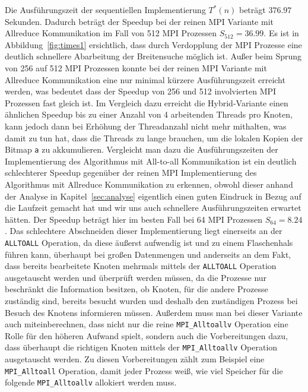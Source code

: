 \documentclass[11pt,a4paper]{article}
\begin{document}
Die Ausführungszeit der sequentiellen Implementierung \(T^{*}(n)\) beträgt \(376.97\) Sekunden. Dadurch beträgt der Speedup bei der reinen MPI Variante mit Allreduce Kommunikation im Fall von 512 MPI Prozessen \(S_{512} = 36.99\). Es ist in Abbildung~\ref{fig:times1} ersichtlich, dass durch Verdopplung der MPI Prozesse eine deutlich schnellere Abarbeitung der Breitensuche möglich ist. Außer beim Sprung von 256 auf 512 MPI Prozessen konnte bei der reinen MPI Variante mit Allreduce Kommunikation eine nur minimal kürzere Ausführungszeit erreicht werden, was bedeutet dass der Speedup von 256 und 512 involvierten MPI Prozessen fast gleich ist. Im Vergleich dazu erreicht die Hybrid-Variante einen ähnlichen Speedup bis zu einer Anzahl von 4 arbeitenden Threads pro Knoten, kann jedoch dann bei Erhöhung der Threadanzahl nicht mehr mithalten, was damit zu tun hat, dass die Threads zu lange brauchen, um die lokalen Kopien der Bitmap \lstinline{a} zu akkumulieren. Vergleicht man dazu die Ausführungszeiten der Implementierung des Algorithmus mit All-to-all Kommunikation ist ein deutlich schlechterer Speedup gegenüber der reinen MPI Implementierung des Algorithmus mit Allreduce Kommunikation zu erkennen, obwohl dieser anhand der Analyse in Kapitel~\ref{sec:analyse} eigentlich einen guten Eindruck in Bezug auf die Laufzeit gemacht hat und wir uns auch schnellere Ausführungszeiten erwartet hätten. Der Speedup beträgt hier im besten Fall bei 64 MPI Prozessen \(S_{64} = 8.24\). Das schlechtere Abschneiden dieser Implementierung liegt einerseits an der \lstinline{ALLTOALL} Operation, da diese äußerst aufwendig ist und zu einem Flaschenhals führen kann, überhaupt bei großen Datenmengen und anderseits an dem Fakt, dass bereits bearbeitete Knoten mehrmals mittels der \lstinline{ALLTOALL} Operation ausgetauscht werden und überprüft werden müssen, da die Prozesse nur beschränkt die Information besitzen, ob Knoten, für die andere Prozesse zuständig sind, bereits besucht wurden und deshalb den zuständigen Prozess bei Besuch des Knotens informieren müssen. Außerdem muss man bei dieser Variante auch miteinberechnen, dass nicht nur die reine \lstinline{MPI_Alltoallv} Operation eine Rolle für den höheren Aufwand spielt, sondern auch die Vorbereitungen dazu, dass überhaupt die richtigen Knoten mittels der \lstinline{MPI_Alltoallv} Operation ausgetauscht werden. Zu diesen Vorbereitungen zählt zum Beispiel eine \lstinline{MPI_Alltoall} Operation, damit jeder Prozess weiß, wie viel Speicher für die folgende \lstinline{MPI_Alltoallv} allokiert werden muss.\\
\end{document}
